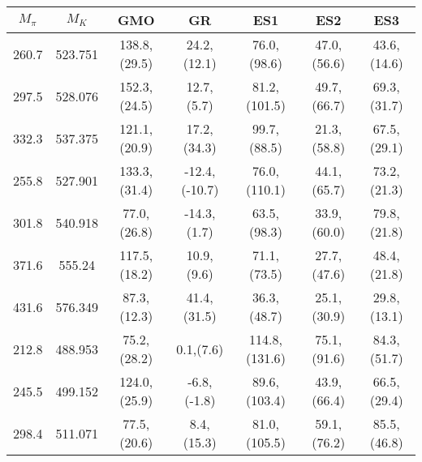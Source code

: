 \documentclass[10pt,a4paper]{article}
\begin{document}
					\begin{table}[h!]
						\begin{tabular}{ccccccc}
							$M_\pi$ & $M_K$ & GMO & GR & ES1 & ES2 & ES3 \\
							\hline 260.7 & 523.751 & 138.8,({\color{blue}29.5}) & 24.2,({\color{blue}12.1}) & 76.0,({\color{blue}98.6}) & 47.0,({\color{blue}56.6}) & 43.6,({\color{blue}14.6}) \\
							297.5 & 528.076 & 152.3,({\color{blue}24.5}) & 12.7,({\color{blue}5.7}) & 81.2,({\color{blue}101.5}) & 49.7,({\color{blue}66.7}) & 69.3,({\color{blue}31.7}) \\
							332.3 & 537.375 & 121.1,({\color{blue}20.9})  & 17.2,({\color{blue}34.3})  & 99.7,({\color{blue}88.5})  & 21.3,({\color{blue}58.8})  & 67.5,({\color{blue}29.1}) \\ 
							\hline
							255.8 & 527.901  & 133.3,({\color{blue}31.4}) & -12.4,({\color{blue}-10.7}) & 76.0,({\color{blue}110.1}) & 44.1,({\color{blue}65.7}) & 73.2,({\color{blue}21.3}) \\
							301.8 & 540.918 & 77.0,({\color{blue}26.8}) & -14.3,({\color{blue}1.7}) & 63.5,({\color{blue}98.3}) & 33.9,({\color{blue}60.0}) & 79.8,({\color{blue}21.8}) \\
							371.6 & 555.24 & 117.5,({\color{blue}18.2}) & 10.9,({\color{blue}9.6}) & 71.1,({\color{blue}73.5}) & 27.7,({\color{blue}47.6}) & 48.4,({\color{blue}21.8}) \\
							431.6 & 576.349 & 87.3,({\color{blue}12.3}) & 41.4,({\color{blue}31.5}) & 36.3,({\color{blue}48.7}) & 25.1,({\color{blue}30.9}) & 29.8,({\color{blue}13.1}) \\
							\hline 212.8 & 488.953 & 75.2,({\color{blue}28.2}) & 0.1,({\color{blue}7.6}) & 114.8,({\color{blue}131.6}) & 75.1,({\color{blue}91.6}) & 84.3,({\color{blue}51.7}) \\
							245.5 & 499.152  & 124.0,({\color{blue}25.9}) & -6.8,({\color{blue}-1.8}) & 89.6,({\color{blue}103.4}) & 43.9,({\color{blue}66.4}) & 66.5,({\color{blue}29.4}) \\
							298.4 & 511.071 & 77.5,({\color{blue}20.6}) & 8.4,({\color{blue}15.3}) & 81.0,({\color{blue}105.5}) & 59.1,({\color{blue}76.2}) & 85.5,({\color{blue}46.8}) \\ 
							\hline
						\end{tabular}
					\end{table}
					
\end{document}
